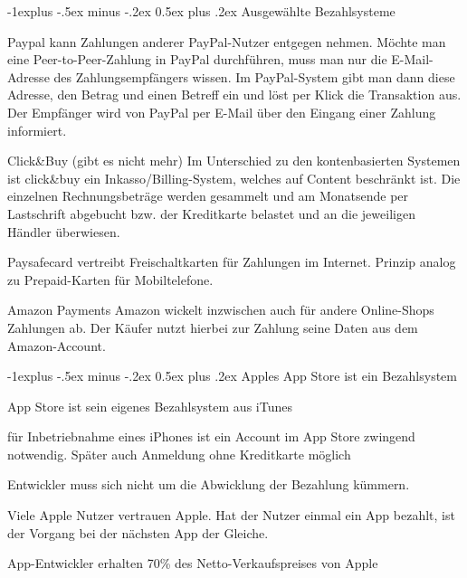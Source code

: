 \documentclass[a4paper]{article}
\makeatletter
\renewcommand{\subsection}{\@startsection{subsection}{2}{0mm}%
                                {-1explus -.5ex minus -.2ex}%
                                {0.5ex plus .2ex}%
                                {\normalfont\normalsize\bfseries}}
\makeatother
\begin{document}
\begin{multicols*}{3}
  \subsection{Ausgewählte Bezahlsysteme}
  \begin{description*}
    \item[Paypal] kann Zahlungen anderer PayPal-Nutzer entgegen nehmen. Möchte man eine  Peer-to-Peer-Zahlung in PayPal durchführen, muss man nur die E-Mail-Adresse des Zahlungsempfängers wissen. Im PayPal-System gibt man dann diese Adresse, den Betrag und einen Betreff ein und löst per Klick die Transaktion aus. Der Empfänger wird von PayPal per E-Mail über den Eingang einer Zahlung informiert.
    \item[Click\&Buy] (gibt es nicht mehr) Im Unterschied zu den kontenbasierten Systemen ist click\&buy ein Inkasso/Billing-System, welches auf Content beschränkt ist. Die einzelnen Rechnungsbeträge werden gesammelt und am Monatsende per Lastschrift abgebucht bzw. der Kreditkarte belastet und an die jeweiligen Händler überwiesen.
    \item[Paysafecard] vertreibt Freischaltkarten für Zahlungen im Internet. Prinzip analog zu Prepaid-Karten für Mobiltelefone.
    \item[Amazon Payments] Amazon wickelt inzwischen auch für andere Online-Shops Zahlungen ab. Der Käufer nutzt hierbei zur Zahlung seine Daten aus dem Amazon-Account.
  \end{description*}

  \subsection{Apples App Store ist ein Bezahlsystem}
  \begin{itemize*}
    \item App Store ist sein eigenes Bezahlsystem aus iTunes
    \item für Inbetriebnahme eines iPhones ist ein Account im App Store zwingend notwendig. Später auch Anmeldung ohne Kreditkarte möglich
    \item Entwickler muss sich nicht um die Abwicklung der Bezahlung kümmern.
    \item Viele Apple Nutzer vertrauen Apple. Hat der Nutzer einmal ein App bezahlt, ist der Vorgang bei der nächsten App der Gleiche.
    \item App-Entwickler erhalten 70\% des Netto-Verkaufspreises von Apple
  \end{itemize*}


\end{multicols*}
\end{document}
